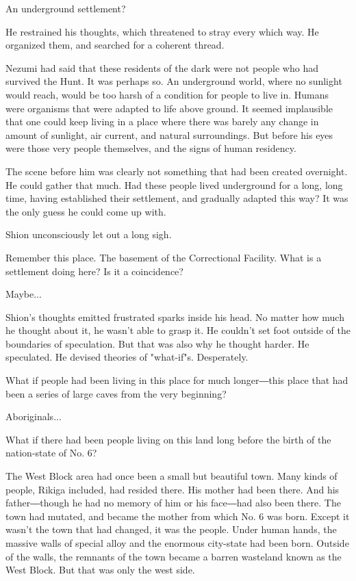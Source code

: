 An underground settlement?

He restrained his thoughts, which threatened to stray every which way.
He organized them, and searched for a coherent thread.

Nezumi had said that these residents of the dark were not people who had
survived the Hunt. It was perhaps so. An underground world, where no
sunlight would reach, would be too harsh of a condition for people to
live in. Humans were organisms that were adapted to life above ground.
It seemed implausible that one could keep living in a place where there
was barely any change in amount of sunlight, air current, and natural
surroundings. But before his eyes were those very people themselves, and
the signs of human residency.

The scene before him was clearly not something that had been created
overnight. He could gather that much. Had these people lived underground
for a long, long time, having established their settlement, and
gradually adapted this way? It was the only guess he could come up with.

Shion unconsciously let out a long sigh.

Remember this place. The basement of the Correctional Facility. What is
a settlement doing here? Is it a coincidence?

Maybe...

Shion's thoughts emitted frustrated sparks inside his head. No matter
how much he thought about it, he wasn't able to grasp it. He couldn't
set foot outside of the boundaries of speculation. But that was also why
he thought harder. He speculated. He devised theories of "what-if"s.
Desperately.

What if people had been living in this place for much longer―this place
that had been a series of large caves from the very beginning?

Aboriginals...

What if there had been people living on this land long before the birth
of the nation-state of No. 6?

The West Block area had once been a small but beautiful town. Many kinds
of people, Rikiga included, had resided there. His mother had been
there. And his father―though he had no memory of him or his face―had
also been there. The town had mutated, and became the mother from which
No. 6 was born. Except it wasn't the town that had changed, it was the
people. Under human hands, the massive walls of special alloy and the
enormous city-state had been born. Outside of the walls, the remnants of
the town became a barren wasteland known as the West Block. But that was
only the west side.


